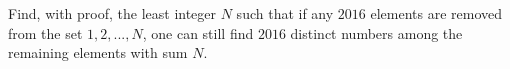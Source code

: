 Find, with proof, the least integer $N$ such that if any $2016$ elements are removed from the set ${1, 2,...,N}$, one can still find $2016$ distinct numbers among the remaining elements with sum $N$.